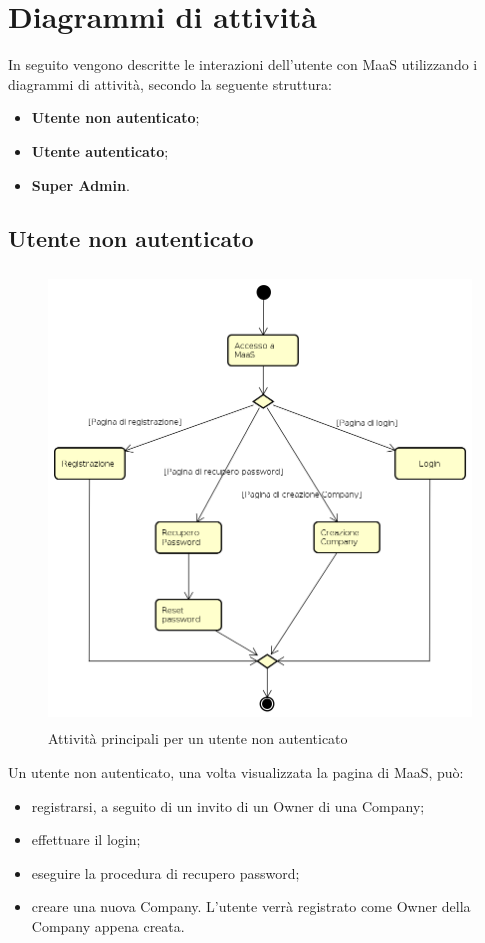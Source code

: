 \section{Diagrammi di attività}
In seguito vengono descritte le interazioni dell'utente con MaaS utilizzando i diagrammi di attività, secondo la seguente struttura:
\begin{itemize}
\item \textbf{Utente non autenticato};
\item \textbf{Utente autenticato};
\item \textbf{Super Admin}.
\end{itemize}
\subsection{Utente non autenticato}
\begin{figure}[H]
\begin{center}
\includegraphics[height=12cm]{res/sections/backend/activities/principaliSenzaAuth.png}
\caption{Attività principali per un utente non autenticato}
\end{center}
\end{figure}
Un utente non autenticato, una volta visualizzata la pagina di MaaS, può:
\begin{itemize}
\item registrarsi, a seguito di un invito di un Owner di una Company;
\item effettuare il login;
\item eseguire la procedura di recupero password;
\item creare una nuova Company. L'utente verrà registrato come Owner della Company appena creata.
\end{itemize}

